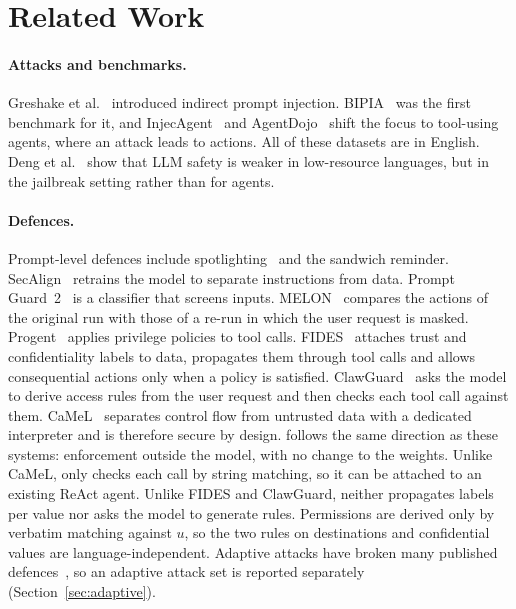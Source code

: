 \section{Related Work}\label{sec:related}

\paragraph{Attacks and benchmarks.} Greshake et al.~\cite{greshake2023indirect} introduced indirect prompt injection.
BIPIA~\cite{yi2025bipia} was the first benchmark for it, and InjecAgent~\cite{zhan2024injecagent} and
AgentDojo~\cite{debenedetti2024agentdojo} shift the focus to tool-using agents, where an attack leads to actions. All of these datasets are in English. Deng et al.~\cite{deng2024multijail}
show that LLM safety is weaker in low-resource languages, but in the jailbreak setting rather than for agents.

\paragraph{Defences.} Prompt-level defences include spotlighting~\cite{hines2024spotlighting} and the sandwich
reminder. SecAlign~\cite{chen2025secalign} retrains the model to separate instructions from data. Prompt
Guard~2~\cite{meta2025promptguard2} is a classifier that screens inputs. MELON~\cite{zhu2025melon} compares the
actions of the original run with those of a re-run in which the user request is masked. Progent~\cite{shi2025progent}
applies privilege policies to tool calls. FIDES~\cite{costa2025fides} attaches trust and confidentiality labels to
data, propagates them through tool calls and allows consequential actions only when a policy is satisfied.
ClawGuard~\cite{zhao2026clawguard} asks the model to derive access rules from the user request and then checks each
tool call against them. CaMeL~\cite{debenedetti2026camel} separates control flow from untrusted data with a dedicated
interpreter and is therefore secure by design. \ours{} follows the same direction as these systems: enforcement
outside the model, with no change to the weights. Unlike CaMeL, \ours{} only checks each call by string matching, so
it can be attached to an existing ReAct agent. Unlike FIDES and ClawGuard, \ours{} neither propagates labels per value
nor asks the model to generate rules. Permissions are derived only by verbatim matching against $u$, so the two rules
on destinations and confidential values are language-independent. Adaptive attacks have broken many published
defences~\cite{zhan2025adaptive,nasr2025attacker}, so an adaptive attack set is reported separately
(Section~\ref{sec:adaptive}).
